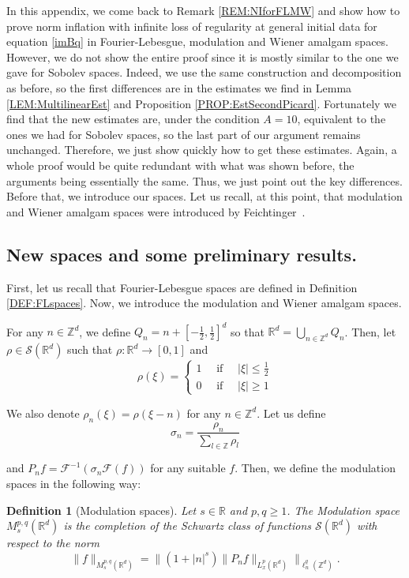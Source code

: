 \documentclass[letterpaper, 11pt,  reqno]{amsart}
\newtheorem{definition}[theorem]{Definition}
\newcommand{\1}{\hspace{0.5mm}\text{I}\hspace{0.5mm}}
\newcommand{\noi}{\noindent}
\newcommand{\Z}{\mathbb{Z}}
\newcommand{\R}{\mathbb{R}}
\newcommand{\F}{\mathcal{F}}
\newcommand{\s}{\sigma}
\numberwithin{equation}{section}
\numberwithin{theorem}{section}
\newcommand{\abs}[1]{\lvert#1\rvert}
\begin{document}
In this appendix, we come back to Remark \ref{REM:NIforFLMW} and show how to prove norm inflation with infinite loss of regularity at general initial data for equation \eqref{imBq} in Fourier-Lebesgue, modulation and Wiener amalgam spaces. However, we do not show the entire proof since it is mostly similar to the one we gave for Sobolev spaces. Indeed, we use the same construction and decomposition as before, so the first differences are in the estimates we find in Lemma \ref{LEM:MultilinearEst} and Proposition \ref{PROP:EstSecondPicard}. Fortunately we find that the new estimates are, under the condition $A = 10$, equivalent to the ones we had for Sobolev spaces, so the last part of our argument remains unchanged. Therefore, we just show quickly how to get these estimates. Again, a whole proof would be quite redundant with what was shown before, the arguments being essentially the same. Thus, we just point out the key differences. Before that, we introduce our spaces. Let us recall, at this point, that modulation and Wiener amalgam spaces were introduced by Feichtinger~\cite{Fei83}.

\subsection{New spaces and some preliminary results.}

First, let us recall that Fourier-Lebesgue spaces are defined in Definition \ref{DEF:FLspaces}. Now, we introduce the modulation and Wiener amalgam spaces. 


For any $n \in \Z^d$, we define $Q_n = n + \left[- \frac 12, \frac 12 \right]^d$ so that $\R^d = \bigcup_{n \in \Z^d} Q_n$. Then, let $\rho \in \mathcal{S} (\R^d)$ such that $\rho \colon \R^d \to [0,1]$ and 
\begin{equation}
\rho(\xi) = \begin{cases}
1 \quad \text{ if } \quad \abs{\xi} \leq \frac 12 \\
0 \quad \text{ if } \quad \abs{\xi} \geq 1
\end{cases}
\end{equation}

\noi We also denote $\rho_n (\xi) = \rho (\xi - n)$ for any $n \in \Z^d$. Let us define
$$
\s_n = \frac{\rho_n}{\sum_{l \in \Z} \rho_l }
$$

\noi and $P_n f = \F^{-1} ( \s_n \F(f))$ for any suitable $f$. Then, we define the modulation spaces in the following way:


\begin{definition}[Modulation spaces] \rm
Let $s \in \R$ and $p,q \geq 1$. The Modulation space $M^{p,q}_s (\R^d)$ is the completion of the Schwartz class of functions $\mathcal{S} ( \R^d)$ with respect to the norm
$$
\| f \|_{M^{p,q}_s (\R^d)} = \big\| (1 +  \abs{n}^s) \|P_n f \|_{L^p_x (\R^d)} \big\|_{\ell^q_n (\Z^d)}.
$$
\end{definition}
\end{document}
